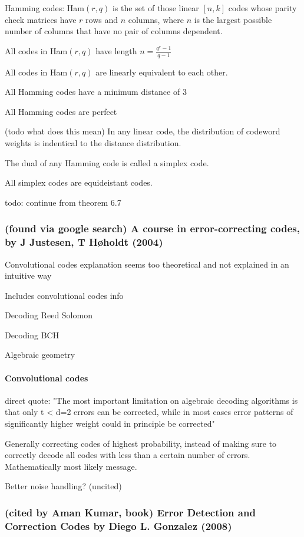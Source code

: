\documentclass{article}
\begin{document}
Hamming codes: Ham$(r, q)$ is the set of those linear $[n, k]$ codes whose parity check matrices have $r$ rows and $n$ columns, where $n$ is the largest possible number of columns that have no pair of columns dependent.

All codes in Ham$(r, q)$ have length $n = \frac{q^r - 1}{q - 1}$

All codes in Ham$(r,q)$ are linearly equivalent to each other.

All Hamming codes have a minimum distance of 3

All Hamming codes are perfect

(todo what does this mean) In any linear code, the distribution of codeword weights is indentical to the distance distribution.

The dual of any Hamming code is called a simplex code. 	

All simplex codes are equideistant codes.

todo: continue from theorem 6.7

\subsubsection{(found via google search) A course in error-correcting codes, by J Justesen, T Høholdt (2004)}

Convolutional codes explanation seems too theoretical and not explained in an intuitive way

Includes convolutional codes info

Decoding Reed Solomon

Decoding BCH

Algebraic geometry

\paragraph{Convolutional codes}

direct quote: "The most important limitation on algebraic decoding algorithms is that only t < d=2 errors can be corrected, while in most cases error patterns of significantly higher weight could in principle be corrected"

Generally correcting codes of highest probability, instead of making sure to correctly decode all codes with less than a certain number of errors. Mathematically most likely message.

Better noise handling? (uncited)

\subsubsection{(cited by Aman Kumar, book) Error Detection and Correction Codes by Diego L. Gonzalez (2008)}
\end{document}
